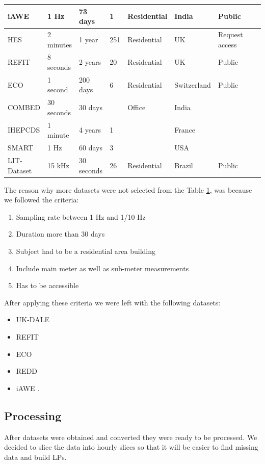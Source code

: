 \begin{table}[H]
{\begin{tabular}{|l|l|l|l|l|l|l|l|l|}
        iAWE & 1 Hz & 73 days & 1 & Residential & India & Public \\ \hline
        HES & 2 minutes & 1 year & 251 & Residential & UK & Request access \\ \hline
        REFIT & 8 seconds & 2 years & 20 & Residential & UK & Public \\ \hline
        ECO & 1 second & 200 days & 6 & Residential & Switzerland & Public \\ \hline
        COMBED & 30 seconds & 30 days & ~ & Office & India & ~ \\ \hline
        IHEPCDS & 1 minute & 4 years & 1 & ~ & France & ~ \\ \hline
        SMART & 1 Hz & 60 days & 3 & ~ & USA & ~ \\ \hline
        LIT-Dataset & 15 kHz & 30 seconds & 26 & Residential & Brazil & Public \\ \hline
    \end{tabular}}
    \label{tab:other_datasets}
\end{table}

The reason why more datasets were not selected from the Table \ref{tab:other_datasets},
was because we followed the criteria:
\begin{enumerate}
    \item Sampling rate between 1 Hz and 1/10 Hz
    \item Duration more than 30 days
    \item Subject had to be a residential area building
    \item Include main meter as well as sub-meter measurements
    \item Has to be accessible
\end{enumerate}

After applying these criteria we were left with the following datasets:

\begin{itemize}
    \item UK-DALE \cite{UKDALE}
    \item REFIT \cite{REFIT}
    \item ECO \cite{ECO}
    \item REDD \cite{REDD}
    \item iAWE \cite{iAWE}.
\end{itemize}

\subsection{Processing}
After datasets were obtained and converted they were ready to be processed.
We decided to slice the data into hourly slices so that it will be easier to find missing data and build LPs.

